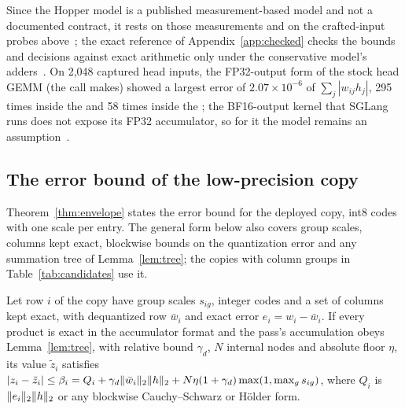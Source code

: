 Since the Hopper model is a published measurement-based model and not a documented contract, it rests on those measurements and on the crafted-input probes above~; the exact reference of Appendix~\ref{app:checked} checks the bounds and decisions against exact arithmetic only under the conservative model's adders~. On 2,048 captured head inputs, the FP32-output form of the stock head GEMM (the call  makes) showed a largest error of $2.07\times10^{-6}$ of $\sum_j|w_{ij}h_j|$, 295 times inside the \modelcons{} and 58 times inside the \modelhopper{}; the BF16-output kernel that SGLang runs does not expose its FP32 accumulator, so for it the model remains an assumption~.

\subsection{The error bound of the low-precision copy}\label{app:envelope}
Theorem~\ref{thm:envelope} states the error bound for the deployed copy, int8 codes with one scale per entry. The general form below also covers group scales, columns kept exact, blockwise bounds on the quantization error and any summation tree of Lemma~\ref{lem:tree}; the copies with column groups in Table~\ref{tab:candidates} use it.
\begin{theorem}\label{thm:envelope-general}
Let row $i$ of the copy have group scales $s_{ig}$, integer codes and a set of columns kept exact, with dequantized row $\bar w_i$ and exact error $e_i=w_i-\bar w_i$. If every product is exact in the accumulator format and the pass's accumulation obeys Lemma~\ref{lem:tree}, with relative bound $\gamma_d$, $N$ internal nodes and absolute floor $\eta$, its value $\tilde z_i$ satisfies $|z_i-\tilde z_i|\le\beta_i=Q_i+\gamma_d\lVert \bar w_i\rVert_2\lVert h\rVert_2+N\eta(1+\gamma_d)\max(1,\max_gs_{ig})$, where $Q_i$ is $\lVert e_i\rVert_2\lVert h\rVert_2$ or any blockwise Cauchy--Schwarz or Hölder form.
\end{theorem}
